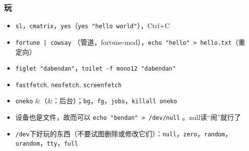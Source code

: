 \documentclass[fontset=none]{ctexbeamer}
\begin{document}
\begin{frame}
    \frametitle{玩}

    \begin{itemize}
        \item \texttt{sl}，\texttt{cmatrix}，\texttt{yes}（\texttt{yes "hello world"}），Ctrl+C
        \item \texttt{fortune | cowsay} （管道，fortune-mod），\texttt{echo "hello" > hello.txt}（重定向）
        \item \texttt{figlet "dabendan"}，\texttt{toilet -f mono12 "dabendan"}
        \item \texttt{fastfetch}, \texttt{neofetch}, \texttt{screenfetch}
        \item \texttt{oneko} \&（\&：后台）；\texttt{bg}，\texttt{fg}，\texttt{jobs}，\texttt{killall oneko}
        \item 设备也是文件，故而可以 \texttt{echo "bendan" > /dev/null} 。null读“闹”就行了
        \item \texttt{/dev}下好玩的东西（不要试图删除或修改它们）：\texttt{null}，\texttt{zero}，\texttt{random}，\texttt{urandom}，\texttt{tty}，\texttt{full}
    \end{itemize}

\end{frame}
\end{document}
